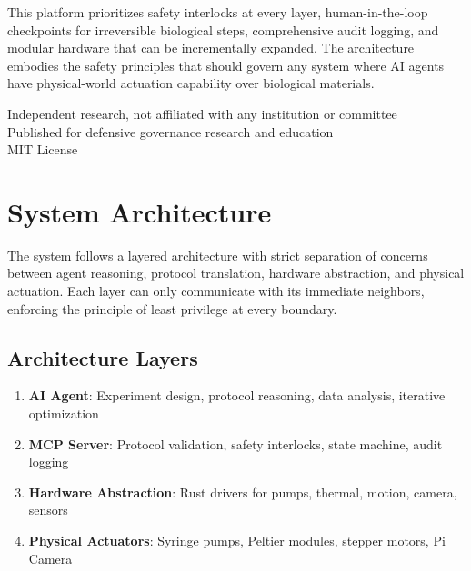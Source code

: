 \documentclass[11pt,letterpaper]{article}
\begin{document}
\begin{titlepage}
\vspace{1cm}

\begin{safetybox}
This platform prioritizes safety interlocks at every layer, human-in-the-loop checkpoints for irreversible biological steps, comprehensive audit logging, and modular hardware that can be incrementally expanded. The architecture embodies the safety principles that should govern any system where AI agents have physical-world actuation capability over biological materials.
\end{safetybox}

\vfill

{\small\color{softslate}\sffamily
Independent research, not affiliated with any institution or committee\\
Published for defensive governance research and education\\
MIT License
}

\end{titlepage}

\tableofcontents
\newpage

\section{System Architecture}

The system follows a layered architecture with strict separation of concerns between agent reasoning, protocol translation, hardware abstraction, and physical actuation. Each layer can only communicate with its immediate neighbors, enforcing the principle of least privilege at every boundary.

\subsection{Architecture Layers}

\begin{keybox}
\begin{enumerate}
  \item \textbf{AI Agent}: Experiment design, protocol reasoning, data analysis, iterative optimization
  \item \textbf{MCP Server}: Protocol validation, safety interlocks, state machine, audit logging
  \item \textbf{Hardware Abstraction}: Rust drivers for pumps, thermal, motion, camera, sensors
  \item \textbf{Physical Actuators}: Syringe pumps, Peltier modules, stepper motors, Pi Camera
\end{enumerate}
\end{keybox}
\end{document}

